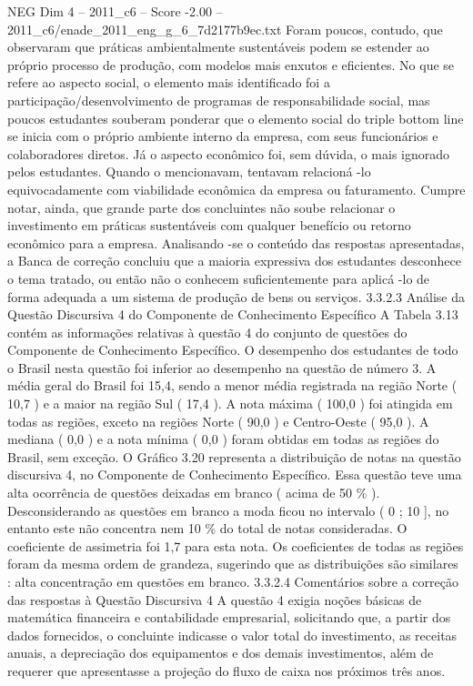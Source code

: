 \begin{textsample}{NEG Dim 4 – 2011\_c6 – Score -2.00 – 2011\_c6/enade\_2011\_eng\_g\_6\_7d2177b9ec.txt}
Foram poucos, contudo, que observaram que práticas ambientalmente sustentáveis podem se estender ao próprio processo de produção, com modelos mais enxutos e eficientes.
No que se refere ao aspecto social, o elemento mais identificado foi a participação/desenvolvimento de programas de responsabilidade social, mas poucos estudantes souberam ponderar que o elemento social do triple bottom line se inicia com o próprio ambiente interno da empresa, com seus funcionários e colaboradores diretos.
Já o aspecto econômico foi, sem dúvida, o mais ignorado pelos estudantes.
Quando o mencionavam, tentavam relacioná -lo equivocadamente com viabilidade econômica da empresa ou faturamento.
Cumpre notar, ainda, que grande parte dos concluintes não soube relacionar o investimento em práticas sustentáveis com qualquer benefício ou retorno econômico para a empresa.
Analisando -se o conteúdo das respostas apresentadas, a Banca de correção concluiu que a maioria expressiva dos estudantes desconhece o tema tratado, ou então não o conhecem suficientemente para aplicá -lo de forma adequada a um sistema de produção de bens ou serviços. 3.3.2.3 Análise da Questão Discursiva 4 do Componente de Conhecimento Específico A Tabela 3.13 contém as informações relativas à questão 4 do conjunto de questões do Componente de Conhecimento Específico.
O desempenho dos estudantes de todo o Brasil nesta questão foi inferior ao desempenho na questão de número 3.
A média geral do Brasil foi 15,4, sendo a menor média registrada na região Norte ( 10,7 ) e a maior na região Sul ( 17,4 ).
A nota máxima ( 100,0 ) foi atingida em todas as regiões, exceto na regiões Norte ( 90,0 ) e Centro-Oeste ( 95,0 ).
A mediana ( 0,0 ) e a nota mínima ( 0,0 ) foram obtidas em todas as regiões do Brasil, sem exceção.
O Gráfico 3.20 representa a distribuição de notas na questão discursiva 4, no Componente de Conhecimento Específico.
Essa questão teve uma alta ocorrência de questões deixadas em branco ( acima de 50 \% ).
Desconsiderando as questões em branco a moda ficou no intervalo ( 0 ; 10 ], no entanto este não concentra nem 10 \% do total de notas consideradas.
O coeficiente de assimetria foi 1,7 para esta nota.
Os coeficientes de todas as regiões foram da mesma ordem de grandeza, sugerindo que as distribuições são similares : alta concentração em questões em branco. 3.3.2.4 Comentários sobre a correção das respostas à Questão Discursiva 4 A questão 4 exigia noções básicas de matemática financeira e contabilidade empresarial, solicitando que, a partir dos dados fornecidos, o concluinte indicasse o valor total do investimento, as receitas anuais, a depreciação dos equipamentos e dos demais investimentos, além de requerer que apresentasse a projeção do fluxo de caixa nos próximos três anos.

\end{textsample}

